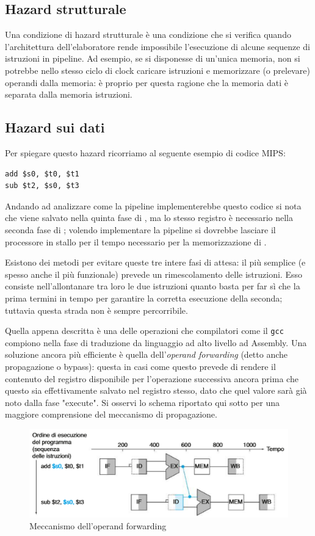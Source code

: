\documentclass[class=book, crop=false, oneside]{standalone}
\begin{document}
\subsection{Hazard strutturale}
Una condizione di hazard strutturale è una condizione che si verifica quando l'architettura dell’elaboratore rende impossibile l’esecuzione di alcune sequenze di istruzioni in pipeline. Ad esempio, se si disponesse di un'unica memoria, non si potrebbe nello stesso ciclo di clock caricare istruzioni e memorizzare (o prelevare) operandi dalla memoria: è proprio per questa ragione che la memoria dati è separata dalla memoria istruzioni.

\subsection{Hazard sui dati}
Per spiegare questo hazard ricorriamo al seguente esempio di codice MIPS:
\begin{verbatim}
add $s0, $t0, $t1
sub $t2, $s0, $t3
\end{verbatim}
Andando ad analizzare come la pipeline implementerebbe questo codice si nota che  viene salvato nella quinta fase di , ma lo stesso registro è necessario nella seconda fase di ; volendo implementare la pipeline si dovrebbe lasciare il processore in stallo per il tempo necessario per la memorizzazione di .

Esistono dei metodi per evitare queste tre intere fasi di attesa: il più semplice (e spesso anche il più funzionale) prevede un rimescolamento delle istruzioni. Esso consiste nell'allontanare tra loro le due istruzioni quanto basta per far sì che la prima termini in tempo per garantire la corretta esecuzione della seconda; tuttavia questa strada non è sempre percorribile.

Quella appena descritta è una delle operazioni che compilatori come il \texttt{gcc} compiono nella fase di traduzione da linguaggio ad alto livello ad Assembly. Una soluzione ancora più efficiente è quella dell'\emph{operand forwarding} (detto anche propagazione o bypass): questa in casi come questo prevede di rendere il contenuto del registro  disponibile per l'operazione successiva ancora prima che questo sia effettivamente salvato nel registro stesso, dato che quel valore sarà già noto dalla fase "execute".
Si osservi lo schema riportato qui sotto per una maggiore comprensione del meccanismo di propagazione.
\begin{figure}[H]
	\centering
	\includegraphics[width=.8\textwidth,keepaspectratio]{propagazione.png}
	\caption{Meccanismo dell'operand forwarding}
\end{figure}
\end{document}
